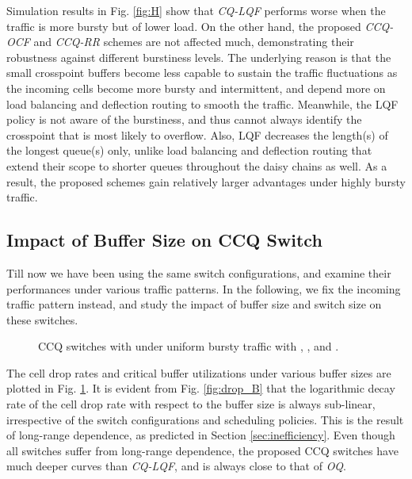 \documentclass[journal,final,doublecolumn,10pt,twoside]{IEEEtranTCOM} \normalsize
\begin{document}
Simulation results in Fig. \ref{fig:H} show that \emph{CQ-LQF} performs worse when the traffic is more bursty but of lower load. On the other hand, the proposed \emph{CCQ-OCF} and \emph{CCQ-RR} schemes are not affected much, demonstrating their robustness against different burstiness levels. The underlying reason is that the small crosspoint buffers become less capable to sustain the traffic fluctuations as the incoming cells become more bursty and intermittent, and depend more on load balancing and deflection routing to smooth the traffic. Meanwhile, the LQF policy is not aware of the burstiness, and thus cannot always identify the crosspoint that is most likely to overflow. Also, LQF decreases the length(s) of the longest queue(s) only, unlike load balancing and deflection routing that extend their scope to shorter queues throughout the daisy chains as well. As a result, the proposed schemes gain relatively larger advantages under highly bursty traffic.

\subsection{Impact of Buffer Size on CCQ Switch}

Till now we have been using the same switch configurations, and examine their performances under various traffic patterns. In the following, we fix the incoming traffic pattern instead, and study the impact of buffer size and switch size on these switches.

\begin{figure}[ht]
\begin{minipage}[t]{3.2 in}
\centering {}
\end{minipage}
\begin{minipage}[t]{3.2 in}
\centering {}
\end{minipage}
\caption{ CCQ switches with  under uniform bursty traffic with , , and .}
\label{fig:B}
\end{figure}

The cell drop rates and critical buffer utilizations under various buffer sizes are plotted in Fig. \ref{fig:B}. It is evident from Fig. \ref{fig:drop_B} that the logarithmic decay rate of the cell drop rate with respect to the buffer size is always sub-linear, irrespective of the switch configurations and scheduling policies. This is the result of long-range dependence, as predicted in Section \ref{sec:inefficiency}. Even though all switches suffer from long-range dependence, the proposed CCQ switches have much deeper curves than \emph{CQ-LQF}, and is always close to that of \emph{OQ}. 
\end{document}
